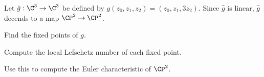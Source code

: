 Let $\hat{g}:\C^3\rightarrow \C^3$ be defined by
$g(z_0,z_1,z_2)=(z_0,z_1,3z_2)$. Since $\hat{g}$ is linear, $\hat{g}$ decends to a map $\CP^2\rightarrow \CP^2$.
\begin{alist}
\item Find the fixed points of $g$.
\item Compute the local Lefschetz number of each fixed point.
\item Use this to compute the Euler characteristic of $\CP^2$.
\end{alist}
